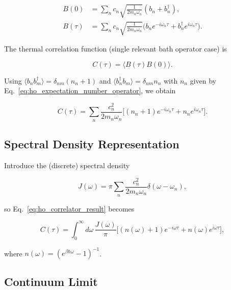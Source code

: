 \begin{align}
	B(0)    & = \sum_{n} c_n \sqrt{\frac{1}{2 m_n \omega_n}} (b_n + b_n^{\dagger}), \label{eq:ho_bath_operator_t0}                                                   \\
	B(\tau) & = \sum_{n} c_n \sqrt{\frac{1}{2 m_n \omega_n}} \Big(b_n e^{-i \omega_n \tau} + b_n^{\dagger} e^{i \omega_n \tau}\Big). \label{eq:ho_bath_operator_tau}
\end{align}

\noindent
The thermal correlation function (single relevant bath operator case) is

\begin{equation} \label{eq:ho_bath_correlator}
	C(\tau) = \langle B(\tau) B(0) \rangle.
\end{equation}

\noindent
Using $\langle b_n b_m^{\dagger} \rangle = \delta_{nm}(n_n+1)$ and $\langle b_n^{\dagger} b_m \rangle = \delta_{nm} n_n$ with $n_n$ given by Eq.~\eqref{eq:ho_expectation_number_operator}, we obtain

\begin{equation} \label{eq:ho_correlator_result}
	C(\tau) = \sum_{n} \frac{c_n^2}{2 m_n \omega_n} \Big[(n_n+1) e^{-i \omega_n \tau} + n_n e^{i \omega_n \tau}\Big].
\end{equation}


\subsection{Spectral Density Representation}
\label{subsec:ho_spectral_density}

\noindent
Introduce the (discrete) spectral density

\begin{equation} \label{eq:ho_bath_spectral_density}
	J(\omega) = \pi \sum_{n} \frac{c_n^2}{2 m_n \omega_n} \delta(\omega - \omega_n),
\end{equation}

\noindent
so Eq.~\eqref{eq:ho_correlator_result} becomes

\begin{equation} \label{eq:ho_correlator_spectral_density}
	C(\tau) = \int_{0}^{\infty} d\omega \, \frac{J(\omega)}{\pi} \Big[(n(\omega)+1)e^{-i \omega \tau} + n(\omega) e^{i \omega \tau}\Big],
\end{equation}

\noindent
where $n(\omega)= (e^{\beta \hbar \omega}-1)^{-1}$.


\subsection{Continuum Limit}
\label{subsec:continuum_limit}

